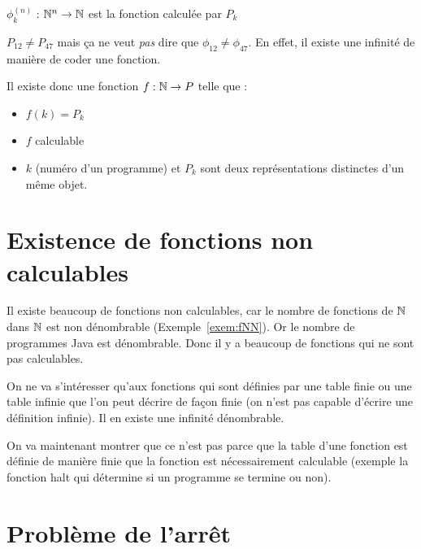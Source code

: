 \begin{mydef}[$\phi^{(n)}_k$]
	$\phi^{(n)}_k$ : $\mathbb{N}^n \rightarrow \mathbb{N}$ est la fonction calculée par $P_k$
\end{mydef}

\begin{myrem}
  $P_{12} \neq P_{47}$ mais ça ne veut \emph{pas} dire que $\phi_{12} \neq \phi_{47}$. En effet, il existe une infinité de manière de coder une fonction.
\end{myrem}

\begin{myprop}
	Il existe donc une fonction $f : \mathbb{N}\rightarrow P$ telle que :
	\begin{itemize}
		\item $f(k) = P_k$
		\item $f$ calculable
		\item $k$ (numéro d'un programme) et $P_k$ sont deux représentations
			distinctes d'un même objet.
	\end{itemize}
\end{myprop}


\section{Existence de fonctions non calculables}
\label{sub:existence_de_fonction_non_calculables}
Il existe beaucoup de fonctions non calculables, car le nombre de fonctions de $\mathbb{N}$ dans $\mathbb{N}$ est non dénombrable (Exemple~\ref{exem:fNN}).
Or le nombre de programmes Java est dénombrable.
Donc il y a beaucoup de fonctions qui ne sont pas calculables.

On ne va s'intéresser qu'aux fonctions qui sont définies par une table finie ou une table infinie que l'on peut décrire de façon finie (on n'est pas capable d'écrire une définition infinie). Il en existe une infinité dénombrable.

On va maintenant montrer que ce n'est pas parce que la table d'une fonction est définie de manière finie que la fonction est nécessairement calculable (exemple la fonction halt qui détermine si un programme se termine ou non).


\section{Problème de l'arrêt}
\label{sub:probl_me_de_l_arr_t}


